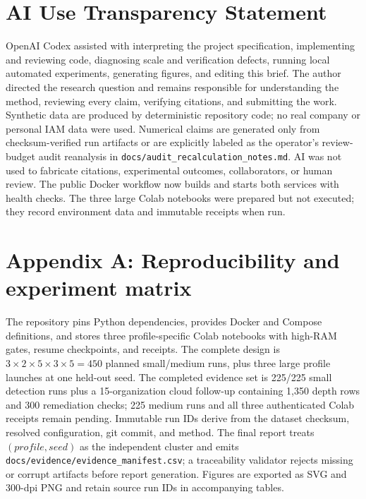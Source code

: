 \documentclass[10pt]{article}
\begin{document}
\section*{AI Use Transparency Statement}
OpenAI Codex assisted with interpreting the project specification, implementing and reviewing code, diagnosing scale and verification defects, running local automated experiments, generating figures, and editing this brief. The author directed the research question and remains responsible for understanding the method, reviewing every claim, verifying citations, and submitting the work. Synthetic data are produced by deterministic repository code; no real company or personal IAM data were used. Numerical claims are generated only from checksum-verified run artifacts or are explicitly labeled as the operator's review-budget audit reanalysis in \texttt{docs/audit\_recalculation\_notes.md}. AI was not used to fabricate citations, experimental outcomes, collaborators, or human review. The public Docker workflow now builds and starts both services with health checks. The three large Colab notebooks were prepared but not executed; they record environment data and immutable receipts when run.

\section*{Appendix A: Reproducibility and experiment matrix}
The repository pins Python dependencies, provides Docker and Compose definitions, and stores three profile-specific Colab notebooks with high-RAM gates, resume checkpoints, and receipts. The complete design is $3\times2\times5\times3\times5=450$ planned small/medium runs, plus three large profile launches at one held-out seed. The completed evidence set is 225/225 small detection runs plus a 15-organization cloud follow-up containing 1,350 depth rows and 300 remediation checks; 225 medium runs and all three authenticated Colab receipts remain pending. Immutable run IDs derive from the dataset checksum, resolved configuration, git commit, and method. The final report treats $(profile, seed)$ as the independent cluster and emits \texttt{docs/evidence/evidence\_manifest.csv}; a traceability validator rejects missing or corrupt artifacts before report generation. Figures are exported as SVG and 300-dpi PNG and retain source run IDs in accompanying tables.
\end{document}
